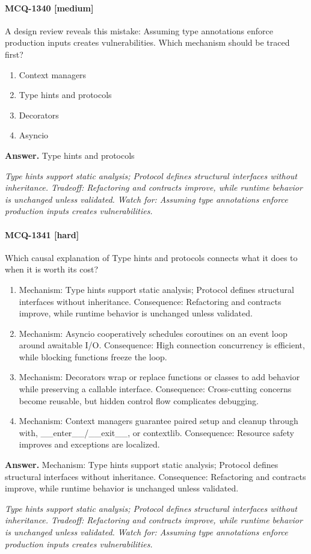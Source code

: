 \paragraph{MCQ-1340 [medium]} A design review reveals this mistake: Assuming type annotations enforce production inputs creates vulnerabilities. Which mechanism should be traced first?
\begin{enumerate}[label=\Alph*.]
\item Context managers
\item Type hints and protocols
\item Decorators
\item Asyncio
\end{enumerate}
\noindent\textbf{Answer.} Type hints and protocols
\par\textit{Type hints support static analysis; Protocol defines structural interfaces without inheritance. Tradeoff: Refactoring and contracts improve, while runtime behavior is unchanged unless validated. Watch for: Assuming type annotations enforce production inputs creates vulnerabilities.}
\paragraph{MCQ-1341 [hard]} Which causal explanation of Type hints and protocols connects what it does to when it is worth its cost?
\begin{enumerate}[label=\Alph*.]
\item Mechanism: Type hints support static analysis; Protocol defines structural interfaces without inheritance. Consequence: Refactoring and contracts improve, while runtime behavior is unchanged unless validated.
\item Mechanism: Asyncio cooperatively schedules coroutines on an event loop around awaitable I/O. Consequence: High connection concurrency is efficient, while blocking functions freeze the loop.
\item Mechanism: Decorators wrap or replace functions or classes to add behavior while preserving a callable interface. Consequence: Cross-cutting concerns become reusable, but hidden control flow complicates debugging.
\item Mechanism: Context managers guarantee paired setup and cleanup through with, \_\_enter\_\_/\_\_exit\_\_, or contextlib. Consequence: Resource safety improves and exceptions are localized.
\end{enumerate}
\noindent\textbf{Answer.} Mechanism: Type hints support static analysis; Protocol defines structural interfaces without inheritance. Consequence: Refactoring and contracts improve, while runtime behavior is unchanged unless validated.
\par\textit{Type hints support static analysis; Protocol defines structural interfaces without inheritance. Tradeoff: Refactoring and contracts improve, while runtime behavior is unchanged unless validated. Watch for: Assuming type annotations enforce production inputs creates vulnerabilities.}
